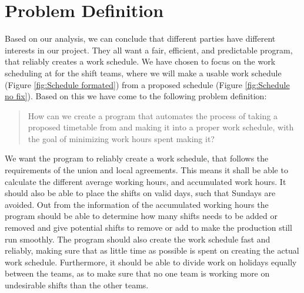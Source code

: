 \section{Problem Definition}
Based on our analysis, we can conclude that different parties have different interests in our project. They all want a fair, efficient, and predictable program, that reliably creates a work schedule. We have chosen to focus on the work scheduling at \siemens for the shift teams, where we will make a usable work schedule (Figure \ref{fig:Schedule formated}) from a proposed schedule (Figure \ref{fig:Schedule no fix}). Based on this we have come to the following problem definition:

\begin{quote}
    How can we create a program that automates the process of taking a proposed timetable  from \siemens and making it into a proper work schedule, with the goal of minimizing work hours spent making it?
\end{quote}

We want the program to reliably create a work schedule, that follows the requirements of the union and local agreements. This means it shall be able to calculate the different average working hours, and accumulated work hours. It should also be able to place the shifts on valid days, such that Sundays are avoided. Out from the information of the accumulated working hours the program should be able to determine how many shifts needs to be added or removed and give potential shifts to remove or add to make the production still run smoothly. The program should also create the work schedule fast and reliably, making sure that as little time as possible is spent on creating the actual work schedule. Furthermore, it should be able to divide work on holidays equally between the teams, as to make sure that no one team is working more on undesirable shifts than the other teams.
